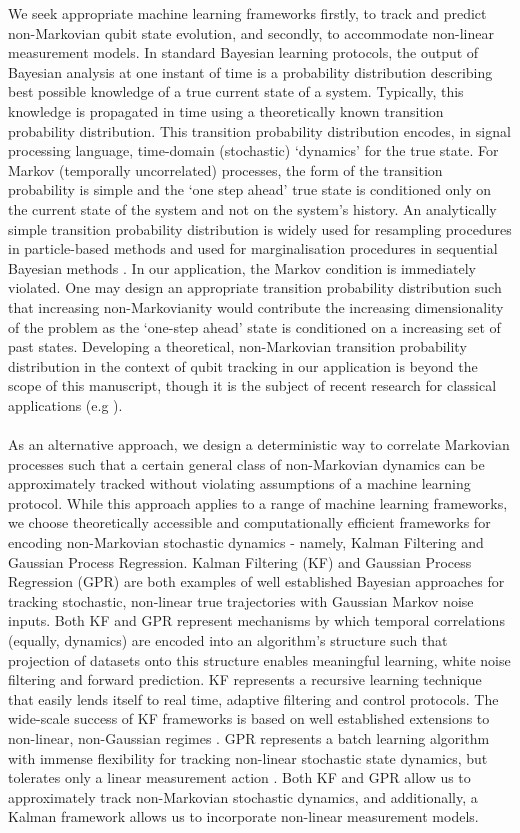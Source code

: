 We seek appropriate machine learning frameworks  firstly, to track and predict non-Markovian qubit state evolution, and secondly, to accommodate non-linear measurement models. In standard Bayesian learning protocols, the output of Bayesian analysis at one instant of time is a probability distribution describing best possible knowledge of a true current state of a system. Typically, this knowledge is propagated in time using a theoretically known transition probability distribution. This transition probability distribution encodes, in signal processing language, time-domain (stochastic) `dynamics' for the true state. For Markov (temporally uncorrelated) processes, the form of the transition probability is simple and the `one step ahead' true state is conditioned only on the current state of the system and not on the system's history. An analytically simple transition probability distribution is widely used for resampling procedures in particle-based methods and used for marginalisation procedures in sequential Bayesian methods \cite{candy2016bayesian}. In our application, the Markov condition is immediately violated. One may design an appropriate transition probability distribution such that increasing non-Markovianity would contribute the increasing dimensionality of the problem as the `one-step ahead' state is conditioned on a increasing set of past states. Developing a theoretical, non-Markovian transition probability distribution in the context of qubit tracking in our application is beyond the scope of this manuscript, though it is the subject of recent research for classical applications (e.g  \cite{jacob2017bayesian}).   
\\ 
\\ 
As an alternative approach, we design a deterministic way to correlate Markovian processes such that a certain general class of non-Markovian dynamics can be approximately tracked without violating assumptions of a machine learning protocol. While this approach applies to a range of machine learning frameworks, we choose theoretically accessible and computationally efficient frameworks for encoding non-Markovian stochastic dynamics  - namely, Kalman Filtering and Gaussian Process Regression. Kalman Filtering (KF) and Gaussian Process Regression (GPR) are both examples of well established Bayesian approaches for tracking stochastic, non-linear true trajectories with Gaussian Markov noise inputs. Both KF and GPR represent mechanisms by which temporal correlations (equally, dynamics) are encoded into an algorithm's structure such that projection of datasets onto this structure enables meaningful learning, white noise filtering and forward prediction.  KF represents a recursive learning technique that easily lends itself to real time, adaptive filtering and control protocols. The wide-scale success of KF frameworks is based on well established extensions to non-linear, non-Gaussian regimes \cite{grewal2001theory}. GPR represents a batch learning algorithm with immense flexibility for tracking non-linear stochastic state dynamics, but tolerates only a linear measurement action \cite{rasmussen2005gaussian}. Both  KF and GPR allow us to approximately track non-Markovian stochastic dynamics, and additionally, a Kalman framework allows us to incorporate non-linear measurement models.
